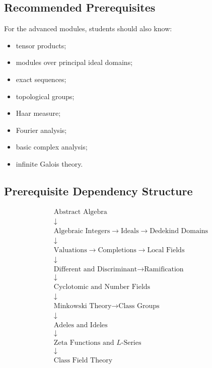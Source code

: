 \documentclass[11pt,a4paper]{article}
\begin{document}
\subsection{Recommended Prerequisites}

For the advanced modules, students should also know:

\begin{itemize}
    \item tensor products;
    \item modules over principal ideal domains;
    \item exact sequences;
    \item topological groups;
    \item Haar measure;
    \item Fourier analysis;
    \item basic complex analysis;
    \item infinite Galois theory.
\end{itemize}

\subsection{Prerequisite Dependency Structure}

\[
\begin{array}{c}
\text{Abstract Algebra}
\\
\downarrow
\\
\text{Algebraic Integers}
\rightarrow
\text{Ideals}
\rightarrow
\text{Dedekind Domains}
\\
\downarrow
\\
\text{Valuations}
\rightarrow
\text{Completions}
\rightarrow
\text{Local Fields}
\\
\downarrow
\\
\text{Different and Discriminant}
\rightarrow
\text{Ramification}
\\
\downarrow
\\
\text{Cyclotomic and Number Fields}
\\
\downarrow
\\
\text{Minkowski Theory}
\rightarrow
\text{Class Groups}
\\
\downarrow
\\
\text{Adeles and Ideles}
\\
\downarrow
\\
\text{Zeta Functions and \(L\)-Series}
\\
\downarrow
\\
\text{Class Field Theory}
\end{array}
\]
\end{document}
